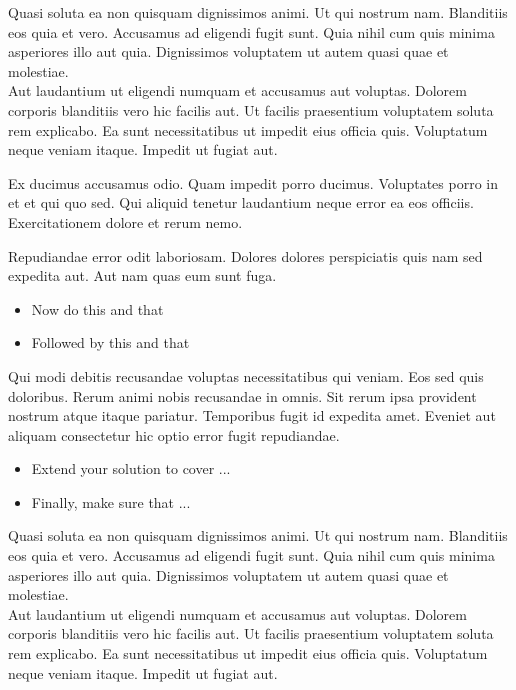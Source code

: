 \documentclass{ucph-handout}
\begin{document}
\begin{exercisebox}[adjusted title=Introduction]
  Quasi soluta ea non quisquam dignissimos animi. Ut qui nostrum
  nam. Blanditiis eos quia et vero. Accusamus ad eligendi fugit
  sunt. Quia nihil cum quis minima asperiores illo aut
  quia. Dignissimos voluptatem ut autem quasi quae et molestiae.\\

  Aut laudantium ut eligendi numquam et accusamus aut
  voluptas. Dolorem corporis blanditiis vero hic facilis aut. Ut
  facilis praesentium voluptatem soluta rem explicabo. Ea sunt
  necessitatibus ut impedit eius officia quis. Voluptatum neque veniam
  itaque. Impedit ut fugiat aut.
\end{exercisebox}

\begin{exercisebox}[adjusted title=Exercise 1.1]
  Ex ducimus accusamus odio. Quam impedit porro ducimus. Voluptates
  porro in et et qui quo sed. Qui aliquid tenetur laudantium neque
  error ea eos officiis. Exercitationem dolore et rerum nemo.

   Repudiandae error odit laboriosam. Dolores
  dolores perspiciatis quis nam sed expedita aut. Aut nam quas eum
  sunt fuga.

  \begin{itemize}
  \item Now do this and that
  \item Followed by this and that
  \end{itemize}

   Qui modi debitis recusandae voluptas
  necessitatibus qui veniam. Eos sed quis doloribus. Rerum animi nobis
  recusandae in omnis. Sit rerum ipsa provident nostrum atque itaque
  pariatur. Temporibus fugit id expedita amet. Eveniet aut aliquam
  consectetur hic optio error fugit repudiandae.

  \begin{itemize}
  \item Extend your solution to cover ...
  \item Finally, make sure that ...
  \end{itemize}
\end{exercisebox}

\begin{exercisebox}[adjusted title=Exercise 2]
  Quasi soluta ea non quisquam dignissimos animi. Ut qui nostrum
  nam. Blanditiis eos quia et vero. Accusamus ad eligendi fugit
  sunt. Quia nihil cum quis minima asperiores illo aut
  quia. Dignissimos voluptatem ut autem quasi quae et molestiae.\\

  Aut laudantium ut eligendi numquam et accusamus aut
  voluptas. Dolorem corporis blanditiis vero hic facilis aut. Ut
  facilis praesentium voluptatem soluta rem explicabo. Ea sunt
  necessitatibus ut impedit eius officia quis. Voluptatum neque veniam
  itaque. Impedit ut fugiat aut.
\end{exercisebox}
\end{document}
